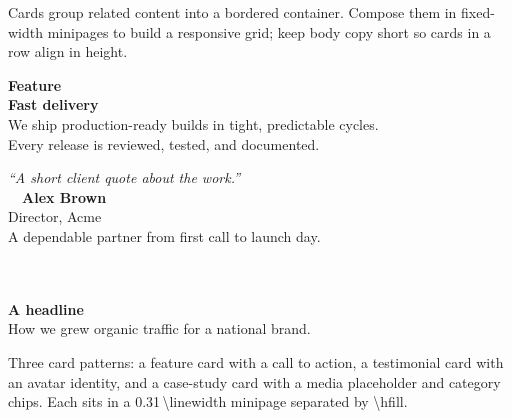 
Cards group related content into a bordered container. Compose them in fixed-width minipages to build a responsive grid; keep body copy short so cards in a row align in height.

\vspace{3mm}

\vspace{1mm}
\noindent
\begin{minipage}[t]{0.31\linewidth}
\begin{uicard}
\textcolor{accent}{\textbf{Feature}}\\[1mm]
{\large\textbf{Fast delivery}}\\[1.5mm]
{\small We ship production-ready builds in tight, predictable cycles.}\\[1mm]
{\small Every release is reviewed, tested, and documented.}\\[2mm]
\end{uicard}
\end{minipage}%
\hfill
\begin{minipage}[t]{0.31\linewidth}
\begin{uicard}
\textit{``A short client quote about the work.''}\\[3mm]
\ \ \textbf{Alex Brown}\\
{\small\color{muted}Director, Acme}\\[2mm]
{\small A dependable partner from first call to launch day.}
\end{uicard}
\end{minipage}%
\hfill
\begin{minipage}[t]{0.31\linewidth}
\begin{uicard}
\colorbox{panel}{\makebox[\linewidth][c]{\rule{0pt}{14mm}}}\\[2mm]
\ \\[2mm]
\textbf{A headline}\\[1mm]
{\small How we grew organic traffic for a national brand.}\\[2mm]
\end{uicard}
\end{minipage}

\vspace{3mm}
{\small\color{muted}Three card patterns: a feature card with a call to action, a testimonial card with an avatar identity, and a case-study card with a media placeholder and category chips. Each sits in a 0.31\,\textbackslash linewidth minipage separated by \textbackslash hfill.}

\clearpage
